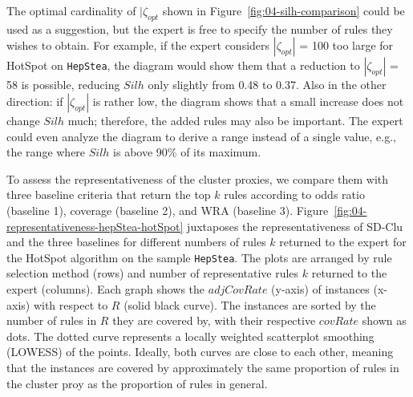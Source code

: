 \documentclass[
  oneside]{book}
\begin{document}
The optimal cardinality of \(|\zeta_{opt}\) shown in Figure~\ref{fig:04-silh-comparison} could be used as a suggestion, but the expert is free to specify the number of rules they wishes to obtain.
For example, if the expert considers \(|\zeta_{opt}|\) = 100 too large for HotSpot on \texttt{HepStea}, the diagram would show them that a reduction to \(|\zeta_{opt}|\) = 58 is possible, reducing \(Silh\) only slightly from 0.48 to 0.37.
Also in the other direction: if \(|\zeta_{opt}|\) is rather low, the diagram shows that a small increase does not change \(Silh\) much; therefore, the added rules may also be important.
The expert could even analyze the diagram to derive a range instead of a single value, e.g., the range where \(Silh\) is above 90\% of its maximum.

To assess the representativeness of the cluster proxies, we compare them with three baseline criteria that return the top \(k\) rules according to odds ratio (baseline 1), coverage (baseline 2), and WRA (baseline 3).
Figure~\ref{fig:04-representativeness-hepStea-hotSpot} juxtaposes the representativeness of SD-Clu and the three baselines for different numbers of rules \(k\) returned to the expert for the HotSpot algorithm on the sample \texttt{HepStea}.
The plots are arranged by rule selection method (rows) and number of representative rules \(k\) returned to the expert (columns).
Each graph shows the \(adjCovRate\) (y-axis) of instances (x-axis) with respect to \(R\) (solid black curve).
The instances are sorted by the number of rules in \(R\) they are covered by, with their respective \(covRate\) shown as dots.
The dotted curve represents a locally weighted scatterplot smoothing (LOWESS) of the points.
Ideally, both curves are close to each other, meaning that the instances are covered by approximately the same proportion of rules in the cluster proy as the proportion of rules in general.
\end{document}
